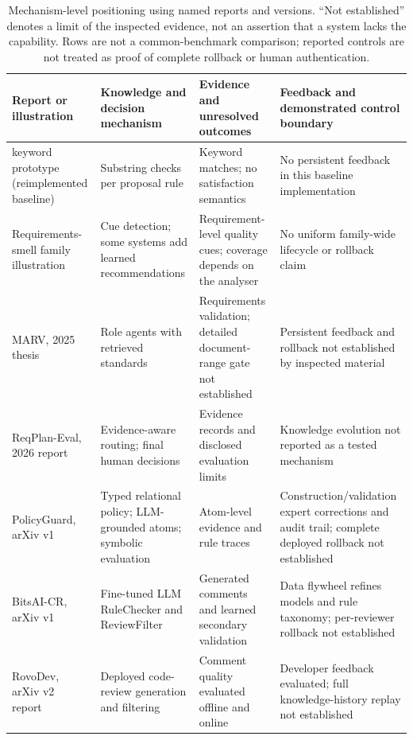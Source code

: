 \begin{table}[!ht]
\caption{Mechanism-level positioning using named reports and versions. ``Not established'' denotes a limit of the inspected evidence, not an assertion that a system lacks the capability. Rows are not a common-benchmark comparison; reported controls are not treated as proof of complete rollback or human authentication.}
\label{tab:positioning}
\centering
\footnotesize
\setlength{\tabcolsep}{3pt}
\begin{tabularx}{\textwidth}{@{}>{\raggedright\arraybackslash}p{2.6cm}>{\raggedright\arraybackslash}X>{\raggedright\arraybackslash}X>{\raggedright\arraybackslash}X@{}}
\toprule
Report or illustration & Knowledge and decision mechanism & Evidence and unresolved outcomes & Feedback and demonstrated control boundary \\
\midrule
2025 keyword prototype (reimplemented baseline) & Substring checks per proposal rule & Keyword matches; no satisfaction semantics & No persistent feedback in this baseline implementation \\
Requirements-smell family illustration~\cite{femmer2017,smell2024,airreq2025} & Cue detection; some systems add learned recommendations & Requirement-level quality cues; coverage depends on the analyser & No uniform family-wide lifecycle or rollback claim \\
MARV, 2025 thesis~\cite{chinnam2025} & Role agents with retrieved standards & Requirements validation; detailed document-range gate not established & Persistent feedback and rollback not established by inspected material \\
ReqPlan-Eval, 2026 report~\cite{alsawalqah2026} & Evidence-aware routing; final human decisions & Evidence records and disclosed evaluation limits & Knowledge evolution not reported as a tested mechanism \\
PolicyGuard, arXiv v1~\cite{malik2026} & Typed relational policy; LLM-grounded atoms; symbolic evaluation & Atom-level evidence and rule traces & Construction/validation expert corrections and audit trail; complete deployed rollback not established \\
BitsAI-CR, arXiv v1~\cite{sun2025} & Fine-tuned LLM RuleChecker and ReviewFilter & Generated comments and learned secondary validation & Data flywheel refines models and rule taxonomy; per-reviewer rollback not established \\
RovoDev, arXiv v2 report~\cite{rovo2026} & Deployed code-review generation and filtering & Comment quality evaluated offline and online & Developer feedback evaluated; full knowledge-history replay not established \\

\end{tabularx}
\end{table}
